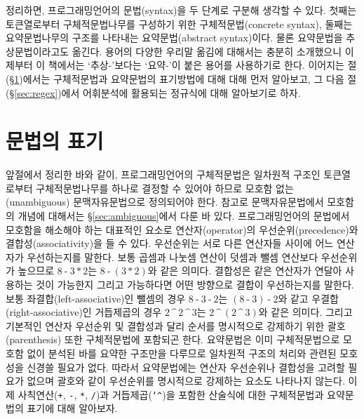 \documentclass[b5paper,chapter,figtabcapt]{oblivoir}
\begin{document}
정리하면, 프로그래밍언어의 문법(syntax)을 두 단계로 구분해 생각할 수 있다.
첫째는 토큰열로부터 구체적문법나무를 구성하기 위한
구체적문법(concrete syntax), 둘째는 요약문법나무의 구조를
나타내는 요약문법(abstract syntax)이다. 물론 요약문법을
추상문법이라고도 옮긴다. 용어의 다양한 우리말 옮김에 대해서는
충분히 소개했으니 이제부터 이 책에서는 `추상-'보다는 `요약-'이 붙은
용어를 사용하기로 한다. 이어지는 절(\S\ref{sec:GrammarNotation})에서는
구체적문법과 요약문법의 표기방법에 대해 대해 먼저 알아보고,
그 다음 절(\S\ref{sec:regex})에서 어휘분석에 활용되는 정규식에
대해 알아보기로 하자.

\section{문법의 표기}
\label{sec:GrammarNotation}
앞절에서 정리한 바와 같이, 프로그래밍언어의 구체적문법은 일차원적 구조인
토큰열로부터 구체적문법나무를 하나로 결정할 수 있어야 하므로 모호함 없는
(unambiguous) 문맥자유문법으로 정의되어야 한다. 참고로 문맥자유문법에서
모호함의 개념에 대해서는 \S\ref{sec:ambiguous}에서 다룬 바 있다.
프로그래밍언어의 문법에서 모호함을 해소해야 하는 대표적인 요소로
연산자(operator)의 우선순위(precedence)와 결합성(associativity)을 들 수 있다.
우선순위는 서로 다른 연산자들 사이에 어느 연산자가 우선하는지를 말한다.
보통 곱셈과 나눗셈 연산이 덧셈과 뺄셈 연산보다 우선순위가 높으므로
$8\mathop{\texttt{-}} 3\mathop{\texttt{*}}2 $는
$8\mathop{\texttt{-}}(3\mathop{\texttt{*}}2)$와 같은 의미다.
결합성은 같은 연산자가 연달아 사용하는 것이 가능한지 그리고
가능하다면 어떤 방향으로 결합이 우선하는지를 말한다.
보통 좌결합(left-associative)인 뺄셈의 경우
$ 8\mathop{\texttt{-}}3 \mathop{\texttt{-}}2$는
$(8\mathop{\texttt{-}}3)\mathop{\texttt{-}}2$와 같고
우결합(right-associative)인 거듭제곱의 경우
$2\mathop{\texttt{\char`^}} 2\mathop{\texttt{\char`^}}3 $는
$2\mathop{\texttt{\char`^}}(2\mathop{\texttt{\char`^}}3)$와 같은 의미다.
그리고 기본적인 연산자 우선순위 및 결합성과 달리 순서를 명시적으로
강제하기 위한 괄호(parenthesis) 또한 구체적문법에 포함되곤 한다.
요약문법은 이미 구체적문법으로 모호함 없이 분석된 바를 요약한 구조만을
다루므로 일차원적 구조의 처리와 관련된 모호성을 신경쓸 필요가 없다.
따라서 요약문법에는 연산자 우선순위나 결합성을 고려할 필요가 없으며
괄호와 같이 우선순위를 명시적으로 강제하는 요소도 나타나지 않는다.
이제 사칙연산(\texttt{+}, \texttt{-}, \texttt{*}, \texttt{/})과
거듭제곱(\texttt{\char`^})을 포함한 산술식에 대한 구체적문법과
요약문법의 표기에 대해 알아보자.
\end{document}
